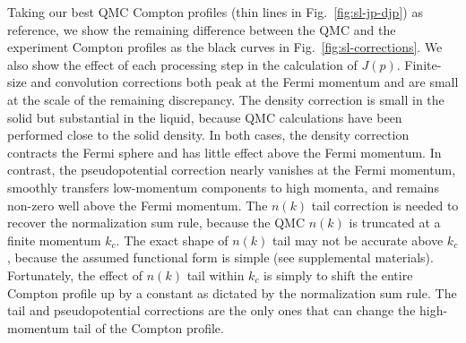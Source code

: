 \documentclass[aps,prb,showpacs,preprintnumbers,amsmath,amssymb,superscriptaddress,twocolumn]{revtex4-1}
\begin{document}
Taking our best QMC Compton profiles (thin lines in Fig.~\ref{fig:sl-jp-djp}) as reference, we show the remaining difference between the QMC and the experiment Compton profiles as the black curves in Fig.~\ref{fig:sl-corrections}. We also show the effect of each processing step in the calculation of $J(p)$. Finite-size and convolution corrections both peak at the Fermi momentum and are small at the scale of the remaining discrepancy. The density correction is small in the solid but substantial in the liquid, because QMC calculations have been performed close to the solid density. In both cases, the density correction contracts the Fermi sphere and has little effect above the Fermi momentum. In contrast, the pseudopotential correction nearly vanishes at the Fermi momentum, smoothly transfers low-momentum components to high momenta, and remains non-zero well above the Fermi momentum. The $n(k)$ tail correction is needed to recover the normalization sum rule, because the QMC $n(k)$ is truncated at a finite momentum $k_c$. The exact shape of $n(k)$ tail may not be accurate above $k_c$, because the assumed functional form is simple (see supplemental materials). Fortunately, the effect of $n(k)$ tail within $k_c$ is simply to shift the entire Compton profile up by a constant as dictated by the normalization sum rule. The tail and pseudopotential corrections are the only ones that can change the high-momentum tail of the Compton profile.

\end{document}
